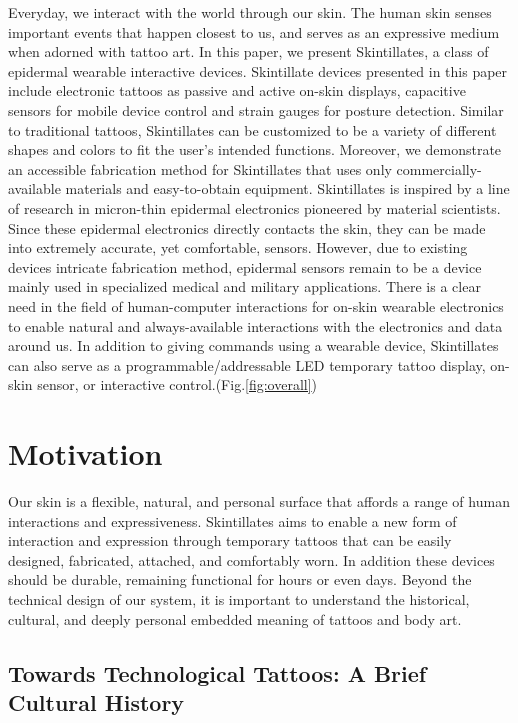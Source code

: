 \documentclass{sigchi}
\begin{document}
Everyday, we interact with the world through our skin. The human skin senses important events that happen closest to us, and serves as an expressive medium when adorned with tattoo art. In this paper, we present Skintillates, a class of epidermal wearable interactive devices. Skintillate devices presented in this paper include electronic tattoos as passive and active on-skin displays, capacitive sensors for mobile device control and strain gauges for posture detection. Similar to traditional tattoos, Skintillates can be customized to be a variety of different shapes and colors to fit the user’s intended functions. Moreover, we demonstrate an accessible fabrication  method  for Skintillates that  uses  only  commercially-available materials and easy-to-obtain equipment. Skintillates is inspired by a line of research in micron-thin epidermal electronics pioneered by material scientists. Since these epidermal electronics directly contacts the skin, they can be made into extremely accurate, yet comfortable, sensors. However, due to existing devices intricate fabrication method, epidermal sensors remain to be a device mainly used in specialized medical and military applications. There is a clear need in the field of human-computer interactions for on-skin wearable electronics to enable natural and always-available interactions with the electronics and data around us\cite{MunehikoSato:2012we,chris:2011ve,ChrisHarrison:2010vi,DavidKim:2012uu,Harrison:2014ft,Laput:2014du}. In addition to giving commands using a wearable device, Skintillates can also serve as a programmable/addressable LED temporary tattoo display, on-skin sensor, or interactive control.(Fig.\ref{fig:overall}) 

\section{Motivation}
Our skin is a flexible, natural, and personal surface that affords a range of human interactions and expressiveness.  Skintillates aims to enable a new form of interaction and expression through temporary tattoos that can be easily designed, fabricated, attached, and comfortably worn.  In addition these devices should be durable, remaining functional for hours or even days. Beyond the technical design of our system, it is important to understand the historical, cultural, and deeply personal embedded meaning of tattoos and body art. 

\subsection{Towards Technological Tattoos: A Brief Cultural History}
\end{document}

